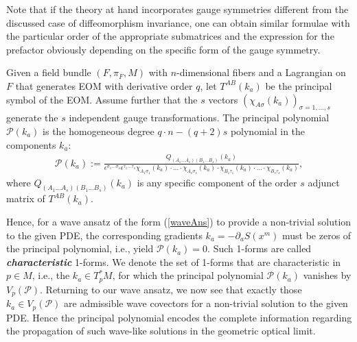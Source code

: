 Note that if the theory at hand incorporates gauge symmetries different from the discussed case of diffeomorphism invariance, one can obtain similar formulae with the particular order of the appropriate submatrices and the expression for the prefactor obviously depending on the specific form of the gauge symmetry.
\begin{definition}
Given a field bundle $(F,\pi_F,M)$ with $n$-dimensional fibers and a Lagrangian on $F$ that generates EOM with derivative order $q$, let  $T^{AB}(k_a)$ be the principal symbol of the EOM. Assume further that the $s$ vectors $(\chi_{A\sigma}(k_a))_{\sigma=1,...,s}$ generate the $s$ independent gauge transformations. The principal polynomial $\mathcal{P}(k_a)$
is the homogeneous degree $q\cdot n - (q+2)s$ polynomial in the components $k_a$:
\begin{align}
\mathcal{P}(k_a) := \frac{Q_{(A_1...A_s)(B_1...B_s)}(k_a)}{\epsilon^{\sigma_1...\sigma_s} \epsilon^{\tau_1...\tau_s} \chi_{A_1\sigma_1}(k_a)\cdot ... \cdot \chi_{A_s\sigma_s}(k_a) \cdot \chi_{B_1\tau_1}(k_a) \cdot ... \cdot \chi_{B_s\tau_s}(k_a)},
\end{align}
where $Q_{(A_1...A_s)(B_1...B_s)}(k_a)$ is any specific component of the order $s$ adjunct matrix of $T^{AB}(k_a)$.
\end{definition}
Hence, for a wave ansatz of the form (\ref{waveAns}) to provide a non-trivial solution to the given PDE, the corresponding gradients $k_a = - \partial_aS(x^m)$ must be zeros of the principal polynomial, i.e., yield $\mathcal{P}(k_a) = 0$.
Such 1-forms are called \textit{\textbf{characteristic}} 1-forms. We denote the set of 1-forms that are characteristic in $p \in M$, i.e., the $k_a \in T_p^{\ast}M$, for which the principal  polynomial $\mathcal{P}(k_a)$ vanishes by $V_p(\mathcal{P})$. Returning to our wave ansatz, we now see that exactly those $k_a \in V_p(\mathcal{P})$ are admissible wave covectors for a non-trivial solution to the given PDE. Hence the principal polynomial encodes the complete information regarding the propagation of such wave-like solutions in the geometric optical limit.

